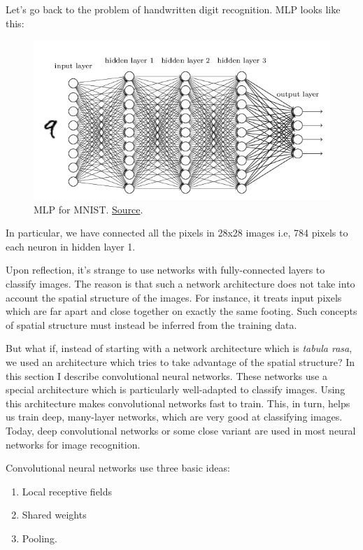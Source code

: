 \documentclass[a4paper]{tufte-handout}
\begin{document}
Let's go back to the problem of handwritten digit recognition. MLP looks
like this:

\begin{figure}
  \includegraphics[width=\linewidth]{mnist_net.png}
  \caption{MLP for MNIST.
  \href{http://neuralnetworksanddeeplearning.com/chap5.html\%22}{Source}.}
\end{figure}


In particular, we have connected all the pixels in 28x28 images i.e, 784
pixels to each neuron in hidden layer 1.

Upon reflection, it's strange to use networks with fully-connected
layers to classify images. The reason is that such a network
architecture does not take into account the spatial structure of the
images. For instance, it treats input pixels which are far apart and
close together on exactly the same footing. Such concepts of spatial
structure must instead be inferred from the training data.

But what if, instead of starting with a network architecture which is
\emph{tabula rasa}, we used an architecture which tries to take
advantage of the spatial structure? In this section I describe
convolutional neural networks. These networks use a special architecture
which is particularly well-adapted to classify images. Using this
architecture makes convolutional networks fast to train. This, in turn,
helps us train deep, many-layer networks, which are very good at
classifying images. Today, deep convolutional networks or some close
variant are used in most neural networks for image recognition.

Convolutional neural networks use three basic ideas:

\begin{enumerate}
\item
  Local receptive fields
\item
  Shared weights
\item
  Pooling.
\end{enumerate}
\end{document}
